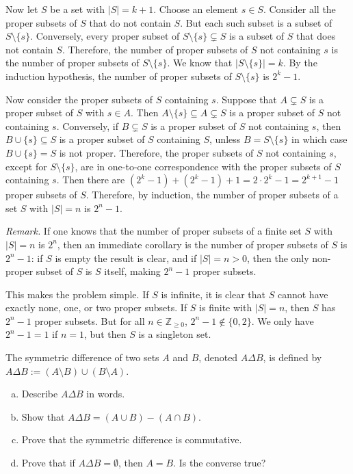 \documentclass[11pt,letterpaper]{article}
\begin{document}
Now let $S$ be a set with $|S|= k + 1$. Choose an element $s \in S$. Consider all the proper subsets of $S$ that do not contain $S$. But each such subset is a subset of $S \setminus \{ s \}$. Conversely, every proper subset of $S \setminus \{ s \} \subsetneq S$ is a subset of $S$ that does not contain $S$. Therefore, the number of proper subsets of $S$ not containing $s$ is the number of proper subsets of $S \setminus \{ s \}$. We know that $|S \setminus \{ s \}|= k$. By the induction hypothesis, the number of proper subsets of $S \setminus \{ s \}$ is $2^k - 1$. 

Now consider the proper subsets of $S$ containing $s$. Suppose that $A \subsetneq S$ is a proper subset of $S$ with $s \in A$. Then $A \setminus \{ s \} \subseteq A \subsetneq S$ is a proper subset of $S$ not containing $s$. Conversely, if $B \subsetneq S$ is a proper subset of $S$ not containing $s$, then $B \cup \{ s \} \subseteq S$ is a proper subset of $S$ containing $S$, unless $B= S \setminus \{ s \}$ in which case $B \cup \{ s \}= S$ is not proper. Therefore, the proper subsets of $S$ not containing $s$, except for $S \setminus \{ s \}$, are in one-to-one correspondence with the proper subsets of $S$ containing $s$. Then there are $(2^k - 1) + (2^k - 1) + 1= 2 \cdot 2^k - 1= 2^{k+1} - 1$ proper subsets of $S$. Therefore, by induction, the number of proper subsets of a set $S$ with $|S|= n$ is $2^n - 1$. 

{\noindent\itshape Remark.} If one knows that the number of proper subsets of a finite set $S$ with $|S|= n$ is $2^n$, then an immediate corollary is the number of proper subsets of $S$ is $2^n - 1$: if $S$ is empty the result is clear, and if $|S|= n > 0$, then the only non-proper subset of $S$ is $S$ itself, making $2^n - 1$ proper subsets. 

This makes the problem simple. If $S$ is infinite, it is clear that $S$ cannot have exactly none, one, or two proper subsets. If $S$ is finite with $|S|= n$, then $S$ has $2^n - 1$ proper subsets. But for all $n \in \mathbb{Z}_{\geq 0}$, $2^n - 1 \notin \{ 0, 2 \}$. We only have $2^n - 1= 1$ if $n= 1$, but then $S$ is a singleton set. 





\newpage





 The symmetric difference of two sets $A$ and $B$, denoted $A \Delta B$, is defined by $A \Delta B:= (A \setminus B) \cup (B \setminus A)$. 
	\begin{enumerate}[(a)]
	\item Describe $A \Delta B$ in words. 
	\item Show that $A \Delta B= (A \cup B) - (A \cap B)$.
	\item Prove that the symmetric difference is commutative. 
	\item Prove that if $A \Delta B= \emptyset$, then $A= B$. Is the converse true? 
	\end{enumerate} \pspace
\end{document}
